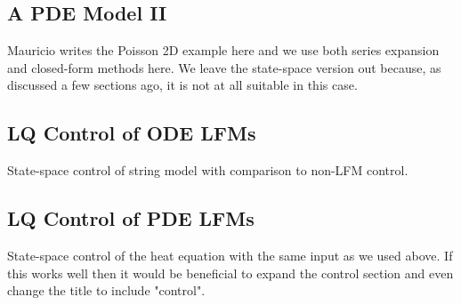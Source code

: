 \documentclass[journal]{IEEEtran}
\newcommand{\simo}[1]{{\color{red}#1}}
\begin{document}
\subsection{A PDE Model II}

\simo{Mauricio writes the Poisson 2D example here and we use both series expansion and closed-form methods here. We leave the state-space version out because, as discussed a few sections ago, it is not at all suitable in this case.}

%

\subsection{LQ Control of ODE LFMs}

\simo{State-space control of string model with comparison to non-LFM control.}

\subsection{LQ Control of PDE LFMs}

\simo{State-space control of the heat equation with the same input as we used above. If this works well then it would be beneficial to expand the control section and even change the title to include "control".}


\end{document}

